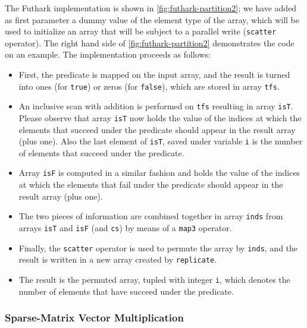 \documentclass[acmsmall,review]{acmart}\settopmatter{printfolios=true,printccs=false,printacmref=false}
\begin{document}
The Futhark implementation is shown in \cref{fig:futhark-partition2};
we have added as first parameter a dummy value of the element type
of the array, which will be used to initialize an array that will
be subject to a parallel write (\lstinline{scatter} operator).
%
The right hand  side of \cref{fig:futhark-partition2} demonstrates
the code on an example. The implementation proceeds as follows:
\begin{itemize}
    \item First, the predicate is mapped on the input array,
            and the result is turned into ones (for \lstinline{true})
            or zeros (for \lstinline{false}), which are stored in
            array {\tt tfs}.
    \item An inclusive scan with addition is performed on {\tt tfs}
            resulting in array {\tt isT}. Please observe that 
            array {\tt isT} now holds the value of the indices at 
            which the elements that succeed under the predicate
            should appear in the result array (plus one). Also
            the last element of {\tt isT}, saved under variable 
            {\tt i} is the number of elements that succeed under 
            the predicate.
    \item Array {\tt isF} is computed in a similar fashion and
            holds the value of the indices at which the elements 
            that fail under the predicate
            should appear in the result array (plus one).
    \item The two pieces of information are combined together
            in array {\tt inds} from arrays {\tt isT} and {\tt isF}
            (and {\tt cs}) by means of a \lstinline{map3} operator.
    \item Finally, the \lstinline{scatter} operator is used to
            permute the array by {\tt inds}, and the result is
            written in a new array created by \lstinline{replicate}.
    \item The result is the permuted array, tupled with integer {\tt i},
            which denotes the number of elements that have succeed 
            under the predicate.
\end{itemize}


\subsubsection{Sparse-Matrix Vector Multiplication}
\label{subsubsub:sparse-mat-vec-mult}
$\mbox{ }$\\
\end{document}
